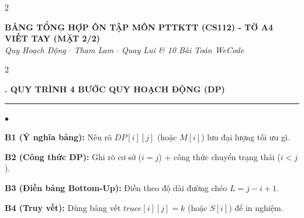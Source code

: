 \documentclass[9pt,a4paper]{article}
\def\labelitemi{$\bullet$}
\renewenvironment{itemize}{%
  \begin{list}{\labelitemi}{%
    \setlength{\topsep}{0pt}%
    \setlength{\partopsep}{0pt}%
    \setlength{\itemsep}{0pt}%
    \setlength{\parsep}{0pt}%
    \setlength{\leftmargin}{10pt}%
  }%
}{\end{list}}
\newcommand{\mysec}[1]{\vspace{2pt}\textbf{\fontsize{9.5}{10.5}\selectfont #1}\vspace{1pt}\hrule\vspace{2pt}}
\begin{document}
\begin{multicols*}{2}
\end{multicols*}

\newpage
\begin{center}
  \textbf{\large BẢNG TỔNG HỢP ÔN TẬP MÔN PTTKTT (CS112) - TỜ A4 VIẾT TAY (MẶT 2/2)}\\
  \small \textit{Quy Hoạch Động $\cdot$ Tham Lam $\cdot$ Quay Lui \& 10 Bài Toán WeCode}
\end{center}
\vspace{-4pt}

\begin{multicols*}{2}

\mysec{1. QUY TRÌNH 4 BƯỚC QUY HOẠCH ĐỘNG (DP)}
\begin{itemize}
  \item \textbf{B1 (Ý nghĩa bảng):} Nêu rõ $DP[i][j]$ (hoặc $M[i]$) lưu đại lượng tối ưu gì.
  \item \textbf{B2 (Công thức DP):} Ghi rõ cơ sở ($i=j$) + công thức chuyển trạng thái ($i<j$).
  \item \textbf{B3 (Điền bảng Bottom-Up):} Điền theo độ dài đường chéo $L=j-i+1$.
  \item \textbf{B4 (Truy vết):} Dùng bảng vết $trace[i][j]=k$ (hoặc $S[i]$) để in nghiệm.
\end{itemize}


\end{multicols*}
\end{document}

